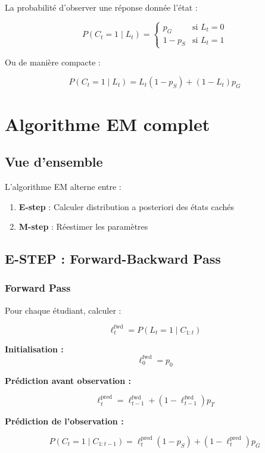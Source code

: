 \documentclass[12pt]{article}
\begin{document}
La probabilité d'observer une réponse donnée l'état :

$$P(C_t = 1 \mid L_t) = \begin{cases}
        p_G     & \text{si } L_t = 0 \\
        1 - p_S & \text{si } L_t = 1
    \end{cases}$$

Ou de manière compacte :

$$P(C_t = 1 \mid L_t) = L_t(1-p_S) + (1-L_t)p_G$$

\newpage

\section{Algorithme EM complet}

\subsection{Vue d'ensemble}

L'algorithme EM alterne entre :

\begin{enumerate}
    \item \textbf{E-step} : Calculer distribution a posteriori des états cachés
    \item \textbf{M-step} : Réestimer les paramètres
\end{enumerate}

\subsection{E-STEP : Forward-Backward Pass}

\subsubsection{Forward Pass}

Pour chaque étudiant, calculer :

$$\ell_t^{\text{fwd}} = P(L_t = 1 \mid C_{1:t})$$

\textbf{Initialisation :}
$$\ell_0^{\text{fwd}} = p_0$$

\textbf{Prédiction avant observation :}

$$\ell_t^{\text{pred}} = \ell_{t-1}^{\text{fwd}} + (1-\ell_{t-1}^{\text{fwd}})p_T$$

\textbf{Prédiction de l'observation :}

$$P(C_t = 1 \mid C_{1:t-1}) = \ell_t^{\text{pred}}(1-p_S) + (1-\ell_t^{\text{pred}})p_G$$
\end{document}
